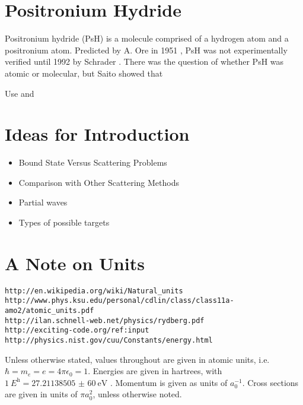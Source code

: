 \documentclass[Introduction.tex]{subfiles}
\begin{document}
\section{Positronium Hydride}
\label{sec:PsH}
Positronium hydride (PsH) is a molecule comprised of a hydrogen atom and a positronium atom.  Predicted by A. Ore in 1951 \cite{Ore1951}, PsH was not experimentally verified until 1992 by Schrader \cite{Schrader1992}. There was the question of whether PsH was atomic or molecular, but Saito \cite{Saito2000} showed that 

Use \cite{Heyrovska2011} and \cite{Saito2000}





\section{Ideas for Introduction}

\begin{itemize}
	\item Bound State Versus Scattering Problems
	\item Comparison with Other Scattering Methods
	\item Partial waves
	\item Types of possible targets
\end{itemize}

\section{A Note on Units}
\label{sec:Units}

\begin{verbatim}
http://en.wikipedia.org/wiki/Natural_units
http://www.phys.ksu.edu/personal/cdlin/class/class11a-amo2/atomic_units.pdf
http://ilan.schnell-web.net/physics/rydberg.pdf
http://exciting-code.org/ref:input
http://physics.nist.gov/cuu/Constants/energy.html
\end{verbatim}


Unless otherwise stated, values throughout are given in atomic units, i.e. $\hbar = m_e = e = 4\pi\epsilon_0 = 1$. Energies are given in hartrees, with $\SI{1}{\hartree} = \SI{27.211 385 05(60)}{\electronvolt}$ \cite{Mohr2012,NISTConversions}. Momentum is given as units of $a_0^{-1}$. Cross sections are given in units of $\pi a_0^2$, unless otherwise noted.
\end{document}
